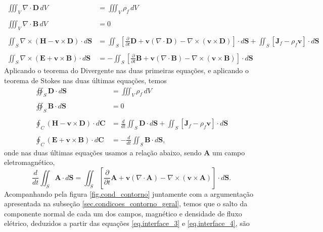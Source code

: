 \begin{align*}
\iiint_V\nabla\cdot\mathbf{D}\,dV&=\iiint_V\rho_f\,dV\\\\
\iiint_V\nabla\cdot\mathbf{B}\,dV&=0\\\\
\iint_S\nabla\times(\mathbf{H}-\mathbf{v}\times\mathbf{D})\cdot d\mathbf{S}&=\iint_S\left[\frac{\partial}{\partial t}\mathbf{D}+\mathbf{v}(\nabla\cdot\mathbf{D})-\nabla\times(\mathbf{v}\times\mathbf{D})\right]\cdot d\mathbf{S}+\iint_S\left[\mathbf{J}_f-\rho_f\mathbf{v}\right]\cdot d\mathbf{S}\\\\
\iint_S\nabla\times(\mathbf{E}+\mathbf{v}\times\mathbf{B})\cdot d\mathbf{S}&=-\iint_S\left[\frac{\partial}{\partial t}\mathbf{B}+\mathbf{v}(\nabla\cdot\mathbf{B})-\nabla\times(\mathbf{v}\times\mathbf{B})\right]\cdot d\mathbf{S}
\end{align*}
Aplicando o teorema do Divergente nas duas primeiras equa\c{c}\~oes, e aplicando o teorema de Stokes nas duas \'ultimas equa\c{c}\~oes, temos
\begin{align}\label{eq.interface_3}
\oiint_S\mathbf{D}\cdot d\mathbf{S}&=\iiint_V\rho_f\,dV\\\nonumber\\\label{eq.interface_4}
\oiint_S\mathbf{B}\cdot d\mathbf{S}&=0\\\nonumber\\\label{eq.interface_5}
\oint_C(\mathbf{H}-\mathbf{v}\times\mathbf{D})\cdot d\mathbf{C}&=\frac{d}{dt}\iint_S\mathbf{D}\cdot d\mathbf{S}+\iint_S\left[\mathbf{J}_f-\rho_f\mathbf{v}\right]\cdot d\mathbf{S}\\\nonumber\\\label{eq.interface_6}
\oint_C(\mathbf{E}+\mathbf{v}\times\mathbf{B})\cdot d\mathbf{C}&=-\frac{d}{dt}\iint_S\mathbf{B}\cdot d\mathbf{S},
\end{align} 
onde nas duas \'ultimas equa\c{c}\~oes usamos a rela\c{c}\~ao abaixo, sendo $\mathbf{A}$ um campo eletromagn\'etico,
\begin{equation*}
\frac{d}{dt}\iint_S\mathbf{A}\cdot d\mathbf{S}=\iint_S\left[\frac{\partial}{\partial t}\mathbf{A}+\mathbf{v}(\nabla\cdot\mathbf{A})-\nabla\times(\mathbf{v}\times\mathbf{A})\right]\cdot d\mathbf{S}.
\end{equation*}
Acompanhando pela figura \ref{fig.cond_contorno} juntamente com a argumenta\c{c}\~ao apresentada na subse\c{c}\~ao \ref{sec.condicoes_contorno_geral}, temos que o salto da componente normal de cada um dos campos, magn\'etico e densidade de fluxo el\'etrico, deduzidos a partir das equa\c{c}\~oes \ref{eq.interface_3} e \ref{eq.interface_4}, s\~ao
